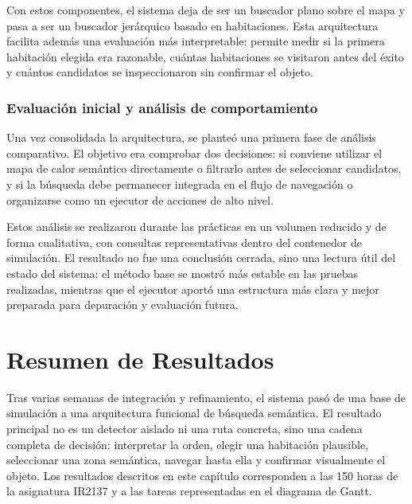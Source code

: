 \documentclass[11pt,fleqn,openany]{book} %
\begin{document}
Con estos componentes, el sistema deja de ser un buscador plano sobre el mapa y pasa a ser un buscador jerárquico basado en habitaciones. Esta arquitectura facilita además una evaluación más interpretable: permite medir si la primera habitación elegida era razonable, cuántas habitaciones se visitaron antes del éxito y cuántos candidatos se inspeccionaron sin confirmar el objeto.

\subsection*{Evaluación inicial y análisis de comportamiento}

Una vez consolidada la arquitectura, se planteó una primera fase de análisis comparativo. El objetivo era comprobar dos decisiones: si conviene utilizar el mapa de calor semántico directamente o filtrarlo antes de seleccionar candidatos, y si la búsqueda debe permanecer integrada en el flujo de navegación o organizarse como un ejecutor de acciones de alto nivel.

Estos análisis se realizaron durante las prácticas en un volumen reducido y de forma cualitativa, con consultas representativas dentro del contenedor de simulación. El resultado no fue una conclusión cerrada, sino una lectura útil del estado del sistema: el método base se mostró más estable en las pruebas realizadas, mientras que el ejecutor aportó una estructura más clara y mejor preparada para depuración y evaluación futura.


\chapter{Resumen de Resultados}\label{chap:resultados}

Tras varias semanas de integración y refinamiento, el sistema pasó de una base de simulación a una arquitectura funcional de búsqueda semántica. El resultado principal no es un detector aislado ni una ruta concreta, sino una cadena completa de decisión: interpretar la orden, elegir una habitación plausible, seleccionar una zona semántica, navegar hasta ella y confirmar visualmente el objeto. Los resultados descritos en este capítulo corresponden a las 150 horas de la asignatura IR2137 y a las tareas representadas en el diagrama de Gantt.
\end{document}
